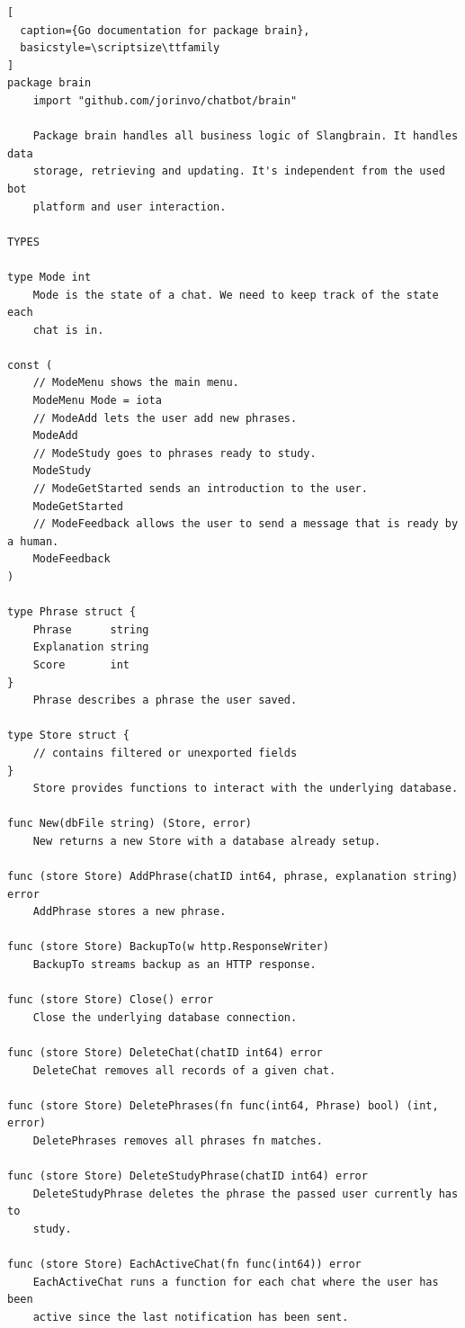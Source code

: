 \pagebreak
\begin{lstlisting}[
  caption={Go documentation for package brain},
  basicstyle=\scriptsize\ttfamily
]
package brain
    import "github.com/jorinvo/chatbot/brain"

    Package brain handles all business logic of Slangbrain. It handles data
    storage, retrieving and updating. It's independent from the used bot
    platform and user interaction.

TYPES

type Mode int
    Mode is the state of a chat. We need to keep track of the state each
    chat is in.

const (
    // ModeMenu shows the main menu.
    ModeMenu Mode = iota
    // ModeAdd lets the user add new phrases.
    ModeAdd
    // ModeStudy goes to phrases ready to study.
    ModeStudy
    // ModeGetStarted sends an introduction to the user.
    ModeGetStarted
    // ModeFeedback allows the user to send a message that is ready by a human.
    ModeFeedback
)

type Phrase struct {
    Phrase      string
    Explanation string
    Score       int
}
    Phrase describes a phrase the user saved.

type Store struct {
    // contains filtered or unexported fields
}
    Store provides functions to interact with the underlying database.

func New(dbFile string) (Store, error)
    New returns a new Store with a database already setup.

func (store Store) AddPhrase(chatID int64, phrase, explanation string) error
    AddPhrase stores a new phrase.

func (store Store) BackupTo(w http.ResponseWriter)
    BackupTo streams backup as an HTTP response.

func (store Store) Close() error
    Close the underlying database connection.

func (store Store) DeleteChat(chatID int64) error
    DeleteChat removes all records of a given chat.

func (store Store) DeletePhrases(fn func(int64, Phrase) bool) (int, error)
    DeletePhrases removes all phrases fn matches.

func (store Store) DeleteStudyPhrase(chatID int64) error
    DeleteStudyPhrase deletes the phrase the passed user currently has to
    study.

func (store Store) EachActiveChat(fn func(int64)) error
    EachActiveChat runs a function for each chat where the user has been
    active since the last notification has been sent.


\end{lstlisting}
